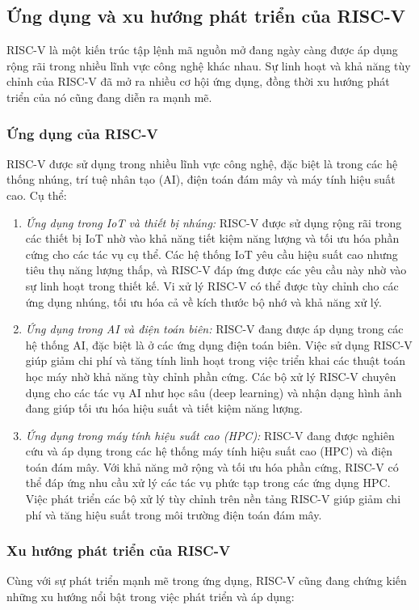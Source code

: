 \subsection{Ứng dụng và xu hướng phát triển của RISC-V }
RISC-V là một kiến trúc tập lệnh mã nguồn mở đang ngày càng được áp dụng rộng rãi trong nhiều lĩnh vực công nghệ khác nhau. Sự linh hoạt và khả năng tùy chỉnh của RISC-V đã mở ra nhiều cơ hội ứng dụng, đồng thời xu hướng phát triển của nó cũng đang diễn ra mạnh mẽ. 

\subsubsection{Ứng dụng của RISC-V}
RISC-V được sử dụng trong nhiều lĩnh vực công nghệ, đặc biệt là trong các hệ thống nhúng, trí tuệ nhân tạo (AI), điện toán đám mây và máy tính hiệu suất cao. Cụ thể:

\begin{enumerate}
    \item \textit{Ứng dụng trong IoT và thiết bị nhúng:} RISC-V được sử dụng rộng rãi trong các thiết bị IoT nhờ vào khả năng tiết kiệm năng lượng và tối ưu hóa phần cứng cho các tác vụ cụ thể. Các hệ thống IoT yêu cầu hiệu suất cao nhưng tiêu thụ năng lượng thấp, và RISC-V đáp ứng được các yêu cầu này nhờ vào sự linh hoạt trong thiết kế. Vi xử lý RISC-V có thể được tùy chỉnh cho các ứng dụng nhúng, tối ưu hóa cả về kích thước bộ nhớ và khả năng xử lý.
    \item \textit{Ứng dụng trong AI và điện toán biên:} RISC-V đang được áp dụng trong các hệ thống AI, đặc biệt là ở các ứng dụng điện toán biên. Việc sử dụng RISC-V giúp giảm chi phí và tăng tính linh hoạt trong việc triển khai các thuật toán học máy nhờ khả năng tùy chỉnh phần cứng. Các bộ xử lý RISC-V chuyên dụng cho các tác vụ AI như học sâu (deep learning) và nhận dạng hình ảnh đang giúp tối ưu hóa hiệu suất và tiết kiệm năng lượng.
    \item \textit{Ứng dụng trong máy tính hiệu suất cao (HPC):} RISC-V đang được nghiên cứu và áp dụng trong các hệ thống máy tính hiệu suất cao (HPC) và điện toán đám mây. Với khả năng mở rộng và tối ưu hóa phần cứng, RISC-V có thể đáp ứng nhu cầu xử lý các tác vụ phức tạp trong các ứng dụng HPC. Việc phát triển các bộ xử lý tùy chỉnh trên nền tảng RISC-V giúp giảm chi phí và tăng hiệu suất trong môi trường điện toán đám mây.
\end{enumerate}

\subsubsection{Xu hướng phát triển của RISC-V}
Cùng với sự phát triển mạnh mẽ trong ứng dụng, RISC-V cũng đang chứng kiến những xu hướng nổi bật trong việc phát triển và áp dụng:

